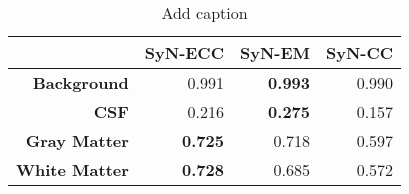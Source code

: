 \begin{table}[htbp]
  \centering
  {\small
    \begin{tabular}{rrrr}
    \toprule
          & \textbf{SyN-ECC} & \textbf{SyN-EM} & \textbf{SyN-CC} \\
    \midrule
    \textbf{Background} & 0.991 & \textbf{0.993} & 0.990 \\
    \textbf{CSF} & 0.216 & \textbf{0.275} & 0.157 \\
    \textbf{Gray Matter} & \textbf{0.725} & 0.718 & 0.597 \\
    \textbf{White Matter} & \textbf{0.728} & 0.685 & 0.572 \\
    \bottomrule
    \end{tabular}}%
  \caption{Add caption}
  \label{tab:addlabel}%
\end{table}%
